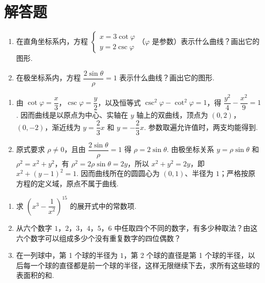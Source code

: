 \section{解答题}

\begin{problem}

\begin{enumerate}
\item 在直角坐标系内，方程 \(\begin{cases}
x=3\cot\varphi\\
y=2\csc\varphi
\end{cases}\)（\(\varphi\) 是参数）表示什么曲线？画出它的图形.
\item 在极坐标系内，方程 \(\dfrac{2\sin\theta}{\rho}=1\) 表示什么曲线？画出它的图形.
\end{enumerate}
\end{problem}

\begin{solution}
\begin{enumerate}
\item 由 \(\cot\varphi=\dfrac{x}{3}\)，\(\csc\varphi=\dfrac{y}{2}\)，以及恒等式 \(\csc^2\varphi-\cot^2\varphi=1\)，得 \(\dfrac{y^2}{4}-\dfrac{x^2}{9}=1\). 因而曲线是以原点为中心、实轴在 \(y\) 轴上的双曲线，顶点为 \((0,2)\)，\((0,-2)\)，渐近线为 \(y=\dfrac{2}{3}x\) 和 \(y=-\dfrac{2}{3}x\). 参数取遍允许值时，两支均能得到.
\item 原式要求 \(\rho\ne0\)，且由 \(\dfrac{2\sin\theta}{\rho}=1\) 得 \(\rho=2\sin\theta\). 由极坐标关系 \(y=\rho\sin\theta\) 和 \(\rho^2=x^2+y^2\)，有 \(\rho^2=2\rho\sin\theta=2y\)，所以 \(x^2+y^2=2y\)，即 \(x^2+\left(y-1\right)^2=1\). 因而曲线所在的圆圆心为 \((0,1)\)、半径为 \(1\)；严格按原方程的定义域，原点不属于曲线.
\end{enumerate}
\end{solution}

\begin{problem}

\begin{enumerate}
\item 求 \(\left(x^{3}-\dfrac{1}{x^{2}}\right)^{15}\) 的展开式中的常数项.

\item 从六个数字 \(1\)，\(2\)，\(3\)，\(4\)，\(5\)，\(6\) 中任取四个不同的数字，有多少种取法？由这六个数字可以组成多少个没有重复数字的四位偶数？

\item 在一列球中，第 1 个球的半径为 \(1\)，第 2 个球的直径是第 1 个球的半径，以后每一个球的直径都是前一个球的半径，这样无限继续下去，求所有这些球的表面积的和.
\end{enumerate}
\end{problem}

